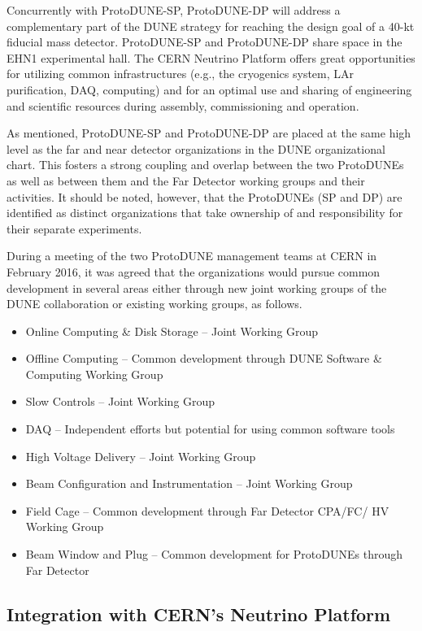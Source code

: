 Concurrently with ProtoDUNE-SP, ProtoDUNE-DP will address a complementary part of the DUNE strategy for reaching the design goal of a 40-kt fiducial mass detector. ProtoDUNE-SP and ProtoDUNE-DP share space in the EHN1 experimental hall.  The CERN Neutrino Platform offers great opportunities for utilizing common infrastructures (e.g., the cryogenics system, LAr purification, DAQ, computing) and for an optimal use and sharing of engineering and scientific resources during assembly, commissioning and operation.

As mentioned, ProtoDUNE-SP and ProtoDUNE-DP are placed at the same high level as the far and near detector organizations in the DUNE organizational chart. This fosters a strong coupling and overlap between the two ProtoDUNEs as well as between them and the Far Detector working groups and their activities. It should be noted, however, that the ProtoDUNEs (SP and DP) are identified as distinct organizations that take ownership of and responsibility for their separate experiments.

During a meeting of the two ProtoDUNE management teams at CERN in February 2016, it was agreed that the organizations would pursue common development in several areas either through new joint working groups of the DUNE collaboration or existing working groups, as follows.


\begin{itemize}
\item Online Computing \& Disk Storage -- Joint Working Group
\item Offline Computing -- Common development through DUNE Software \& Computing Working Group
\item Slow Controls -- Joint Working Group
\item DAQ -- Independent efforts but potential for using common software tools
\item High Voltage Delivery -- Joint Working Group
\item Beam Configuration and Instrumentation -- Joint Working Group
\item Field Cage -- Common development through Far Detector CPA/FC/ HV Working Group
\item Beam Window and Plug -- Common development for ProtoDUNEs through Far Detector
\end{itemize}

\subsection{Integration with CERN's Neutrino Platform}

